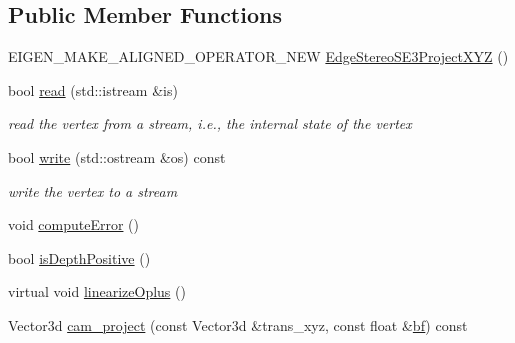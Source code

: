 \subsection*{Public Member Functions}
\begin{DoxyCompactItemize}
\item 
E\+I\+G\+E\+N\+\_\+\+M\+A\+K\+E\+\_\+\+A\+L\+I\+G\+N\+E\+D\+\_\+\+O\+P\+E\+R\+A\+T\+O\+R\+\_\+\+N\+EW \mbox{\hyperlink{classg2o_1_1_edge_stereo_s_e3_project_x_y_z_a3a9c1b7c0b165f8c1c0690373481fea5}{Edge\+Stereo\+S\+E3\+Project\+X\+YZ}} ()
\item 
bool \mbox{\hyperlink{classg2o_1_1_edge_stereo_s_e3_project_x_y_z_a59cdc820a694379a73a26d51d948db0e}{read}} (std\+::istream \&is)
\begin{DoxyCompactList}\small\item\em read the vertex from a stream, i.\+e., the internal state of the vertex \end{DoxyCompactList}\item 
bool \mbox{\hyperlink{classg2o_1_1_edge_stereo_s_e3_project_x_y_z_ad6d441e7c5858b4efa8392f9ed96b2bf}{write}} (std\+::ostream \&os) const
\begin{DoxyCompactList}\small\item\em write the vertex to a stream \end{DoxyCompactList}\item 
void \mbox{\hyperlink{classg2o_1_1_edge_stereo_s_e3_project_x_y_z_ab60521439da10eabb13f23fe21fbe651}{compute\+Error}} ()
\item 
bool \mbox{\hyperlink{classg2o_1_1_edge_stereo_s_e3_project_x_y_z_ac176aff8aa08a73f52d7a0f5c3080d4d}{is\+Depth\+Positive}} ()
\item 
virtual void \mbox{\hyperlink{classg2o_1_1_edge_stereo_s_e3_project_x_y_z_aea04d86a304c6cb4e2a3f34b35166f30}{linearize\+Oplus}} ()
\item 
Vector3d \mbox{\hyperlink{classg2o_1_1_edge_stereo_s_e3_project_x_y_z_a5e1d2a6a247a6f9a95ccb7a59e3c543e}{cam\+\_\+project}} (const Vector3d \&trans\+\_\+xyz, const float \&\mbox{\hyperlink{classg2o_1_1_edge_stereo_s_e3_project_x_y_z_afc94291834aa40d18205e61ac802cbfc}{bf}}) const
\end{DoxyCompactItemize}
